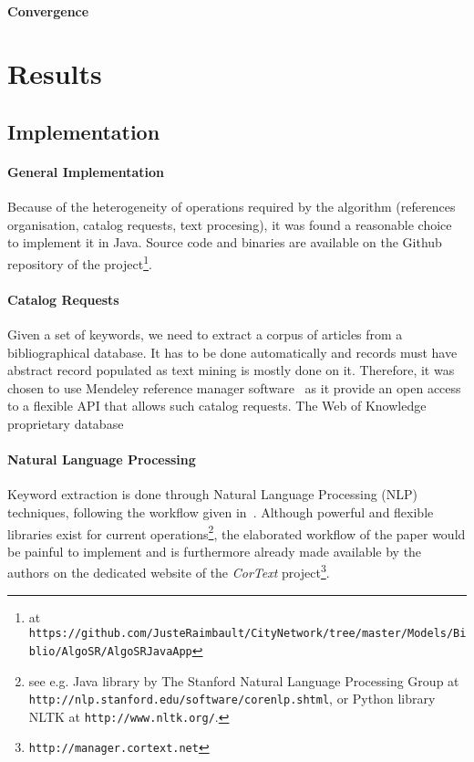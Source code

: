 \paragraph{Convergence}



\section{Results}

\subsection{Implementation}

\paragraph{General Implementation}
Because of the heterogeneity of operations required by the algorithm (references organisation, catalog requests, text procesing), it was found a reasonable choice to implement it in Java. Source code and binaries are available on the Github repository of the project\footnote{at \texttt{https://github.com/JusteRaimbault/CityNetwork/tree/master/Models/Biblio/AlgoSR/AlgoSRJavaApp}}.

\paragraph{Catalog Requests}
Given a set of keywords, we need to extract a corpus of articles from a bibliographical database. It has to be done automatically and records must have abstract record populated as text mining is mostly done on it. Therefore, it was chosen to use Mendeley reference manager software~\cite{mendeley} as it provide an open access to a flexible API that allows such catalog requests. The Web of Knowledge proprietary database~\cite{}


\paragraph{Natural Language Processing}
Keyword extraction is done through Natural Language Processing (NLP) techniques, following the workflow given in~\cite{chavalarias2013phylomemetic}. Although powerful and flexible libraries exist for current operations\footnote{see e.g. Java library by The Stanford Natural Language Processing Group at \texttt{http://nlp.stanford.edu/software/corenlp.shtml}, or Python library NLTK at \texttt{http://www.nltk.org/}.}, the elaborated workflow of the paper would be painful to implement and is furthermore already made available by the authors on the dedicated website of the \emph{CorText} project\footnote{\texttt{http://manager.cortext.net}}.



